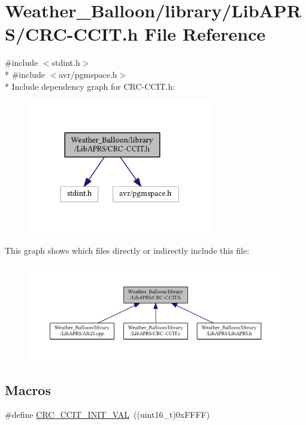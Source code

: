 \hypertarget{_c_r_c-_c_c_i_t_8h}{}\section{Weather\+\_\+\+Balloon/library/\+Lib\+A\+P\+R\+S/\+C\+R\+C-\/\+C\+C\+IT.h File Reference}
\label{_c_r_c-_c_c_i_t_8h}
{\ttfamily \#include $<$stdint.\+h$>$}\\*
{\ttfamily \#include $<$avr/pgmspace.\+h$>$}\\*
Include dependency graph for C\+R\+C-\/\+C\+C\+IT.h\+:
\nopagebreak
\begin{figure}[H]
\begin{center}
\leavevmode
\includegraphics[width=228pt]{_c_r_c-_c_c_i_t_8h__incl}
\end{center}
\end{figure}
This graph shows which files directly or indirectly include this file\+:
\nopagebreak
\begin{figure}[H]
\begin{center}
\leavevmode
\includegraphics[width=350pt]{_c_r_c-_c_c_i_t_8h__dep__incl}
\end{center}
\end{figure}
\subsection*{Macros}
\begin{DoxyCompactItemize}
\item 
\#define \hyperlink{_c_r_c-_c_c_i_t_8h_ae53bd48601e15e51c3d3c658afae6419}{C\+R\+C\+\_\+\+C\+C\+I\+T\+\_\+\+I\+N\+I\+T\+\_\+\+V\+AL}~((uint16\+\_\+t)0x\+F\+F\+F\+F)
\end{DoxyCompactItemize}
